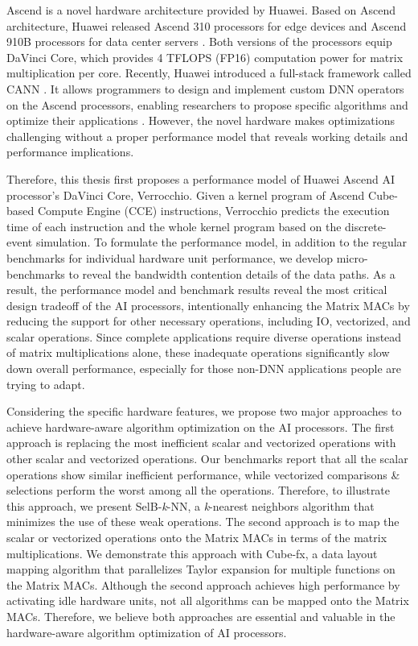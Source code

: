 \documentclass[12pt]{extbook}
\begin{document}
Ascend \cite{DBLP:conf/hotchips/LiaoTXZ19} is a novel hardware architecture provided by Huawei. Based on Ascend architecture, Huawei released Ascend 310 processors for edge devices \cite{DBLP:conf/hotchips/LiaoTXZ19} and Ascend 910B processors for data center servers \cite{910}. Both versions of the processors equip DaVinci Core, which provides 4 TFLOPS (FP16) computation power for matrix multiplication per core. Recently, Huawei introduced a full-stack framework called CANN \cite{CANN}. It allows programmers to design and implement custom DNN operators on the Ascend processors, enabling researchers to propose specific algorithms and optimize their applications \cite{DBLP:conf/ipps/RohwedderCAACW21, DBLP:conf/icpp/JiW21}. However, the novel hardware makes optimizations challenging without a proper performance model that reveals working details and performance implications.

Therefore, this thesis first proposes a performance model of Huawei Ascend AI processor's DaVinci Core, Verrocchio. Given a kernel program of Ascend Cube-based Compute Engine (CCE) instructions, Verrocchio predicts the execution time of each instruction and the whole kernel program based on the discrete-event simulation. To formulate the performance model, in addition to the regular benchmarks for individual hardware unit performance, we develop micro-benchmarks to reveal the bandwidth contention details of the data paths. As a result, the performance model and benchmark results reveal the most critical design tradeoff of the AI processors, intentionally enhancing the Matrix MACs by reducing the support for other necessary operations, including IO, vectorized, and scalar operations. Since complete applications require diverse operations instead of matrix multiplications alone, these inadequate operations significantly slow down overall performance, especially for those non-DNN applications people are trying to adapt.

Considering the specific hardware features, we propose two major approaches to achieve hardware-aware algorithm optimization on the AI processors. The first approach is replacing the most inefficient scalar and vectorized operations with other scalar and vectorized operations. Our benchmarks report that all the scalar operations show similar inefficient performance, while vectorized comparisons \& selections perform the worst among all the operations. Therefore, to illustrate this approach, we present SelB-\textit{k}-NN, a \textit{k}-nearest neighbors algorithm that minimizes the use of these weak operations. The second approach is to map the scalar or vectorized operations onto the Matrix MACs in terms of the matrix multiplications. We demonstrate this approach with Cube-fx, a data layout mapping algorithm that parallelizes Taylor expansion for multiple functions on the Matrix MACs. Although the second approach achieves high performance by activating idle hardware units, not all algorithms can be mapped onto the Matrix MACs. Therefore, we believe both approaches are essential and valuable in the hardware-aware algorithm optimization of AI processors.
\end{document}

